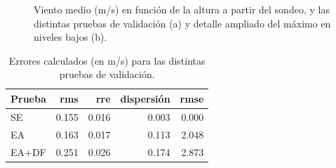 \documentclass[12pt,spanish,oneside, a4paper]{book}
\begin{document}
\begin{figure}

{\centering {}

}

\caption{Viento medio (m/s) en función de la altura a partir del sondeo, y las distintas pruebas de validación (a) y detalle ampliado del máximo en niveles bajos (b). \label{validacion-perfiles}}\label{fig:validacion-perfiles}
\end{figure}

\begin{table}

\caption{\label{tab:validacion-errores}Errores calculados (en m/s) para las distintas pruebas de validación. \label{validacion-errores}}
\centering
\begin{tabular}[t]{lrrrr}
\toprule
Prueba & rms & rre & dispersión & rmse\\
\midrule
SE & 0.155 & 0.016 & 0.003 & 0.000\\
EA & 0.163 & 0.017 & 0.113 & 2.048\\
EA+DF & 0.251 & 0.026 & 0.174 & 2.873\\
\bottomrule
\end{tabular}
\end{table}
\end{document}
